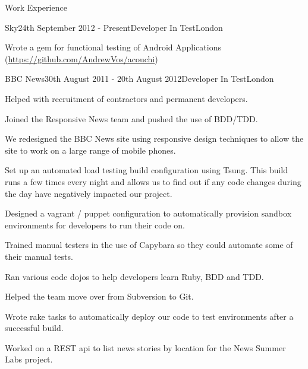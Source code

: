 \documentclass{resume}
\begin{document}
  \begin{rSection}{Work Experience}
    \begin{rSubsection}{Sky}{24th September 2012 - Present}{Developer In Test}{London}
      \item Wrote a gem for functional testing of Android Applications (\url{https://github.com/AndrewVos/acouchi})
    \end{rSubsection}

    \begin{rSubsection}{BBC News}{30th August 2011 - 20th August 2012}{Developer In Test}{London}
      \item Helped with recruitment of contractors and permanent developers.
      \item Joined the Responsive News team and pushed the use of BDD/TDD.
      \item We redesigned the BBC News site using responsive design techniques to allow the site to work on a large range of mobile phones.
      \item Set up an automated load testing build configuration using Tsung. This build runs a few times every night and allows us to find out if any code changes during the day have negatively impacted our project.
      \item Designed a vagrant / puppet configuration to automatically provision sandbox environments for developers to run their code on.
      \item Trained manual testers in the use of Capybara so they could automate some of their manual tests.
      \item Ran various code dojos to help developers learn Ruby, BDD and TDD.
      \item Helped the team move over from Subversion to Git.
      \item Wrote rake tasks to automatically deploy our code to test environments after a successful build.
      \item Worked on a REST api to list news stories by location for the News Summer Labs project.
    \end{rSubsection}


\end{rSection}
\end{document}
